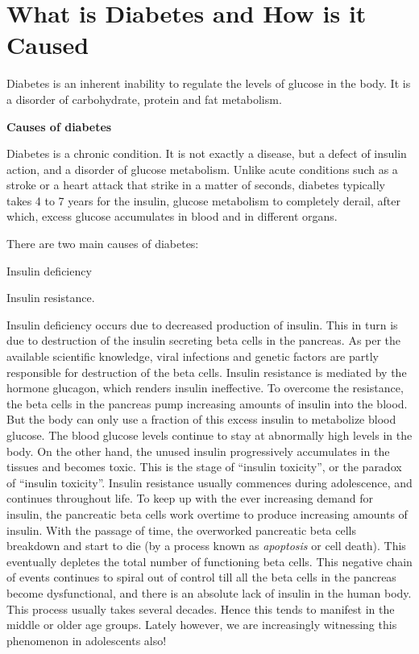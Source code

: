 \chapter{What is Diabetes and How is it Caused}

Diabetes is an inherent inability to regulate the levels of glucose in the body. It is a disorder of carbohydrate, protein and fat metabolism.

\textbf{Causes of diabetes}

Diabetes is a chronic condition. It is not exactly a disease, but a defect of insulin action, and a disorder of glucose metabolism. Unlike acute conditions such as a stroke or a heart attack that strike in a matter of seconds, diabetes typically takes 4 to 7 years for the insulin, glucose metabolism to completely derail, after which, excess glucose accumulates in blood and in different organs.

There are two main causes of diabetes:

\item Insulin deficiency

 \item Insulin resistance.

Insulin deficiency occurs due to decreased production of insulin. This in turn is due to destruction of the insulin secreting beta cells in the pancreas. As per the available scientific knowledge, viral infections and genetic factors are partly responsible for destruction of the beta cells. Insulin resistance is mediated by the hormone glucagon, which renders insulin ineffective. To overcome the resistance, the beta cells in the pancreas pump increasing amounts of insulin into the blood. But the body can only use a fraction of this excess insulin to metabolize blood glucose. The blood glucose levels continue to stay at abnormally high levels in the body. On the other hand, the unused insulin progressively accumulates in the tissues and becomes toxic. This is the stage of “insulin toxicity”, or the paradox of “insulin toxicity”. Insulin resistance usually commences during adolescence, and continues throughout life. To keep up with the ever increasing demand for insulin, the pancreatic beta cells work overtime to produce increasing amounts of insulin. With the passage of time, the overworked pancreatic beta cells breakdown and start to die (by a process known as \textit{apoptosis} or cell death). This eventually depletes the total number of functioning beta cells. This negative chain of events continues to spiral out of control till all the beta cells in the pancreas become dysfunctional, and there is an absolute lack of insulin in the human body. This process usually takes several decades. Hence this tends to manifest in the middle or older age groups. Lately however, we are increasingly witnessing this phenomenon in adolescents also!

